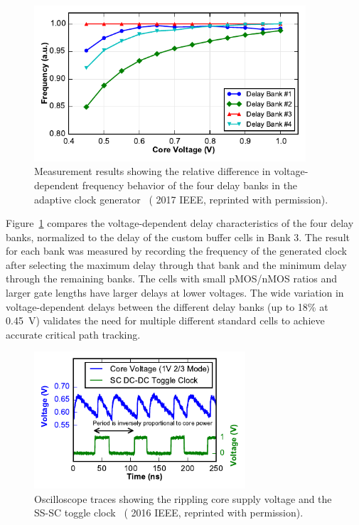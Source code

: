 \documentclass[graybox]{svmult}
\begin{document}
\begin{figure}
  \centering
  \includegraphics[width=0.9\textwidth]{6-raven4-clockgen-trc}
  \caption{Measurement results showing the relative difference in voltage-dependent frequency behavior of the four delay banks in the adaptive clock generator~\cite{Keller2017, reprinted with permission} ({\textcopyright} 2017 IEEE, reprinted with permission).}
  \label{fig:6-raven4-clockgen-trc}
\end{figure}

Figure~\ref{fig:6-raven4-clockgen-trc} compares the voltage-dependent delay characteristics of the four delay banks, normalized to the delay of the custom buffer cells in Bank 3.
The result for each bank was measured by recording the frequency of the generated clock after selecting the maximum delay through that bank and the minimum delay through the remaining banks.
The cells with small pMOS/nMOS ratios and larger gate lengths have larger delays at lower voltages.
The wide variation in voltage-dependent delays between the different delay banks (up to 18\% at \SI{0.45}{\volt}) validates the need for multiple different standard cells to achieve accurate critical path tracking.

\begin{figure}
  \centering
  \includegraphics[width=0.7\textwidth]{6-raven4-waveforms-powermeas}
  \caption{Oscilloscope traces showing the rippling core supply voltage and the SS-SC toggle clock~\cite{Keller2016} ({\textcopyright} 2016 IEEE, reprinted with permission).}
  \label{fig:6-raven4-waveforms-powermeas}
\end{figure}
\end{document}
